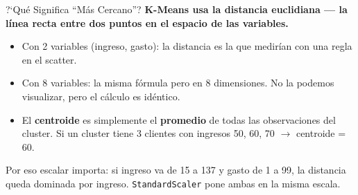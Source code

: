 \documentclass[aspectratio=169, 11pt]{beamer}
\begin{document}
\begin{frame}{?`Qu\'e Significa ``M\'as Cercano''?}
  \vspace{-4pt}
  {\footnotesize\color{arcaDark}\bfseries
    K-Means usa la \textbf{distancia euclidiana} --- la l\'inea recta
    entre dos puntos en el espacio de las variables.}

  \vspace{6pt}
  {\footnotesize
  \begin{itemize}\setlength{\itemsep}{5pt}
    \item[{\color{arcaRed}\scriptsize\faArrowRight}]
      Con 2 variables (ingreso, gasto): la distancia es la que
      medir\'ian con una regla en el scatter.
    \item[{\color{arcaRed}\scriptsize\faArrowRight}]
      Con 8 variables: la misma f\'ormula pero en 8 dimensiones.
      No la podemos visualizar, pero el c\'alculo es id\'entico.
    \item[{\color{arcaRed}\scriptsize\faArrowRight}]
      El \textbf{centroide} es simplemente el \textbf{promedio}
      de todas las observaciones del cluster. Si un cluster tiene
      3 clientes con ingresos 50, 60, 70 $\to$ centroide = 60.
  \end{itemize}
  }

  \vspace{4pt}
  {\scriptsize\color{textMuted}
    \faLightbulb\hspace{4pt} Por eso escalar importa: si ingreso va
    de 15 a 137 y gasto de 1 a 99, la distancia queda dominada por
    ingreso. \texttt{StandardScaler} pone ambas en la misma escala.}
\end{frame}
\end{document}

